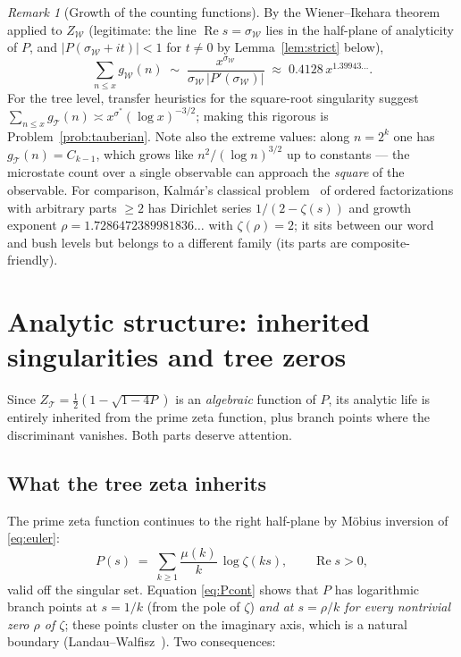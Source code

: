 \documentclass[11pt]{article}
\newcommand{\cT}{\mathcal{T}}   %
\newcommand{\cW}{\mathcal{W}}   %
\numberwithin{equation}{section}
\theoremstyle{plain}
\theoremstyle{definition}
\theoremstyle{remark}
\newtheorem{remark}[theorem]{Remark}
\begin{document}
\begin{remark}[Growth of the counting functions]\label{rem:growth}
By the Wiener--Ikehara theorem applied to $Z_\cW$ (legitimate: the line
$\operatorname{Re} s = \sigma_\cW$ lies in the half-plane of analyticity of $P$, and
$|P(\sigma_\cW + it)| < 1$ for $t \ne 0$ by Lemma~\ref{lem:strict} below),
\[
\sum_{n \le x} g_\cW(n) \;\sim\; \frac{x^{\sigma_\cW}}{\sigma_\cW\,|P'(\sigma_\cW)|}
\;\approx\; 0.4128\, x^{1.39943\dots}.
\]
For the tree level, transfer heuristics for the square-root singularity suggest
$\sum_{n \le x} g_\cT(n) \asymp x^{\sigma^{*}} (\log x)^{-3/2}$; making this rigorous is
Problem~\ref{prob:tauberian}. Note also the extreme values: along $n = 2^k$ one has
$g_\cT(n) = C_{k-1}$, which grows like $n^{2}/(\log n)^{3/2}$ up to constants --- the
microstate count over a single observable can approach the \emph{square} of the
observable. For comparison, Kalm\'ar's classical problem~\cite{kalmar} of ordered
factorizations with arbitrary parts $\ge 2$ has Dirichlet series $1/(2 - \zeta(s))$ and
growth exponent $\rho = 1.7286472389981836\dots$ with $\zeta(\rho) = 2$; it sits between
our word and bush levels but belongs to a different family (its parts are composite-friendly).
\end{remark}

\section{Analytic structure: inherited singularities and tree zeros}\label{sec:analytic}

Since $Z_\cT = \tfrac12(1 - \sqrt{1-4P})$ is an \emph{algebraic} function of $P$, its
analytic life is entirely inherited from the prime zeta function, plus branch points
where the discriminant vanishes. Both parts deserve attention.

\subsection{What the tree zeta inherits}

The prime zeta function continues to the right half-plane by M\"obius inversion of
\eqref{eq:euler}:
\begin{equation}\label{eq:Pcont}
P(s) \;=\; \sum_{k \ge 1} \frac{\mu(k)}{k}\, \log \zeta(ks),
\qquad \operatorname{Re} s > 0,
\end{equation}
valid off the singular set. Equation \eqref{eq:Pcont} shows that $P$ has logarithmic
branch points at $s = 1/k$ (from the pole of $\zeta$) \emph{and at $s = \rho/k$ for
every nontrivial zero $\rho$ of $\zeta$}; these points cluster on the imaginary axis,
which is a natural boundary (Landau--Walfisz~\cite{landauwalfisz}). Two consequences:
\end{document}
